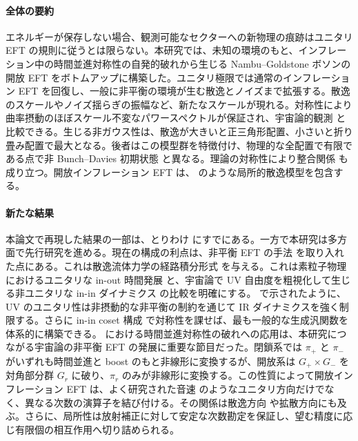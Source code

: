 \documentclass[a4paper,11pt]{ltjsarticle}
\numberwithin{equation}{section}
\def\pir{\pi_{r}}
\begin{document}
\paragraph{全体の要約} エネルギーが保存しない場合、観測可能なセクターへの新物理の痕跡はユニタリ EFT の規則に従うとは限らない。本研究では、未知の環境のもと、インフレーション中の時間並進対称性の自発的破れから生じる Nambu--Goldstone ボソンの開放 EFT をボトムアップに構築した。ユニタリ極限では通常のインフレーション EFT \cite{Cheung:2007st} を回復し、一般に非平衡の環境が生む散逸とノイズまで拡張する。散逸のスケールやノイズ揺らぎの振幅など、新たなスケールが現れる。対称性により曲率摂動のほぼスケール不変なパワースペクトルが保証され、宇宙論的観測 \cite{Planck:2018jri, DAmico:2019fhj, Colas:2019ret} と比較できる。生じる非ガウス性は、散逸が大きいと正三角形配置、小さいと折り畳み配置で最大となる。後者はこの模型群を特徴付け、物理的な全配置で有限である点で非 Bunch--Davies 初期状態 \cite{Holman:2007na, Chen:2006nt, Meerburg:2009ys, Agullo:2010ws, Ashoorioon:2010xg, Agarwal:2012mq, Ashoorioon:2013eia,  Albrecht:2014aga, Green:2020whw} と異なる。理論の対称性により整合関係 \cite{Maldacena:2002vr,Creminelli:2004yq, Cheung:2007sv, Creminelli:2012ed,Hinterbichler:2012nm,Assassi:2012zq,Pajer:2017hmb,Avis:2019eav} も成り立つ。開放インフレーション EFT は、\cite{Creminelli:2023aly} のような局所的散逸模型を包含する。

\paragraph{新たな結果} 本論文で再現した結果の一部は、とりわけ \cite{LopezNacir:2011kk,Hongo:2018ant,Creminelli:2023aly} にすでにある。一方で本研究は多方面で先行研究を進める。現在の構成の利点は、非平衡 EFT の手法 \cite{Liu:2018kfw} を取り入れた点にある。これは散逸流体力学の経路積分形式 \cite{Crossley:2015evo, Glorioso:2016gsa} を与える。これは素粒子物理におけるユニタリな in-out 時間発展 \cite{Donath:2024utn} と、宇宙論で UV 自由度を粗視化して生じる非ユニタリな in-in ダイナミクス \cite{Burgess:2022rdo, Colas:2023wxa} の比較を明確にする。\cite{Crossley:2015evo, Glorioso:2016gsa, Liu:2018kfw} で示されたように、UV のユニタリ性は非摂動的な非平衡の制約を通じて IR ダイナミクスを強く制限する。さらに in-in coset 構成 \cite{Akyuz:2023lsm} で対称性を課せば、最も一般的な生成汎関数を体系的に構築できる。\cite{Hongo:2018ant} における時間並進対称性の破れへの応用は、本研究につながる宇宙論の非平衡 EFT \cite{Ota:2024mps} の発展に重要な節目だった。閉鎖系では $\pi_+$ と $\pi_-$ がいずれも時間並進と boost のもと非線形に変換するが、開放系は $G_+\times G_-$ を対角部分群 $G_r$ に破り、$\pir$ のみが非線形に変換する。この性質によって開放インフレーション EFT は、よく研究された音速 \cite{Cheung:2007st} のようなユニタリ方向だけでなく、異なる次数の演算子を結び付ける。その関係は散逸方向 \cite{LopezNacir:2011kk} や拡散方向にも及ぶ。さらに、局所性は放射補正に対して安定な次数勘定を保証し、望む精度に応じ有限個の相互作用へ切り詰められる。
\end{document}

